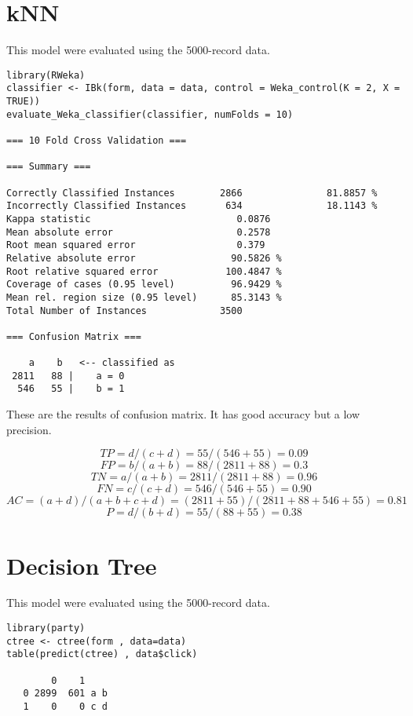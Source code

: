 \documentclass[11pt,a4paper]{article}
\begin{document}
\section{kNN}
\label{sec-7}
This model were evaluated using the 5000-record data.

\begin{verbatim}
library(RWeka)
classifier <- IBk(form, data = data, control = Weka_control(K = 2, X = TRUE))
evaluate_Weka_classifier(classifier, numFolds = 10)

=== 10 Fold Cross Validation ===

=== Summary ===

Correctly Classified Instances        2866               81.8857 %
Incorrectly Classified Instances       634               18.1143 %
Kappa statistic                          0.0876
Mean absolute error                      0.2578
Root mean squared error                  0.379 
Relative absolute error                 90.5826 %
Root relative squared error            100.4847 %
Coverage of cases (0.95 level)          96.9429 %
Mean rel. region size (0.95 level)      85.3143 %
Total Number of Instances             3500     

=== Confusion Matrix ===

    a    b   <-- classified as
 2811   88 |    a = 0
  546   55 |    b = 1
\end{verbatim}


These are the results of confusion matrix. It has good
accuracy but a low precision.

$$TP = d / (c+d) = 55 / (546 + 55) = 0.09$$
$$FP = b / (a+b) = 88/(2811+88)=0.3$$
$$TN = a / (a+b) = 2811/(2811+88)=0.96$$
$$FN = c / (c+d) = 546/(546+55)=0.90$$
$$AC=(a+d)/(a+b+c+d) = (2811+55) / (2811+88+546+55) = 0.81$$
$$P = d / (b+d) = 55 / (88 + 55) = 0.38$$

\section{Decision Tree}
\label{sec-8}
This model were evaluated using the 5000-record data.

\begin{verbatim}
library(party)
ctree <- ctree(form , data=data)
table(predict(ctree) , data$click)

        0    1
   0 2899  601 a b
   1    0    0 c d
\end{verbatim}
\end{document}
